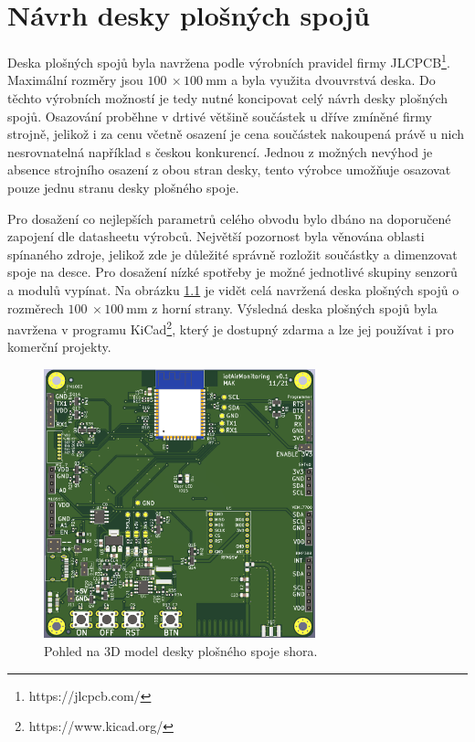 \chapter{Návrh desky plošných spojů}

Deska plošných spojů byla navržena podle výrobních pravidel firmy JLCPCB\footnote{https://jlcpcb.com/}. Maximální rozměry jsou $\SI{100}{}\times \SI{100}{\milli\metre}$ a byla využita dvouvrstvá deska. Do těchto výrobních možností je tedy nutné koncipovat celý návrh desky plošných spojů. Osazování proběhne v drtivé většině součástek u dříve zmíněné firmy strojně, jelikož i za cenu včetně osazení je cena součástek nakoupená právě u nich nesrovnatelná například s českou konkurencí. Jednou z možných nevýhod je absence strojního osazení z obou stran desky, tento výrobce umožňuje osazovat pouze jednu stranu desky plošného spoje.

Pro dosažení co nejlepších parametrů celého obvodu bylo dbáno na doporučené zapojení dle datasheetu výrobců. Největší pozornost byla věnována oblasti spínaného zdroje, jelikož zde je důležité správně rozložit součástky a dimenzovat spoje na desce. Pro dosažení nízké spotřeby je možné jednotlivé skupiny senzorů a modulů vypínat. Na obrázku \ref{fig_PCB-top} je vidět celá navržená deska plošných spojů o rozměrech $\SI{100}{}\times \SI{100}{\milli\metre}$ z horní strany. Výsledná deska plošných spojů byla navržena v programu KiCad\footnote{https://www.kicad.org/}, který je dostupný zdarma a lze jej používat i pro komerční projekty.

\begin{figure}[h]
    \centering
    \includegraphics[width=0.7\textwidth]{obrazky/PCB_top.png}
    \caption{Pohled na 3D model desky plošného spoje shora.}
    \label{fig_PCB-top}
\end{figure}